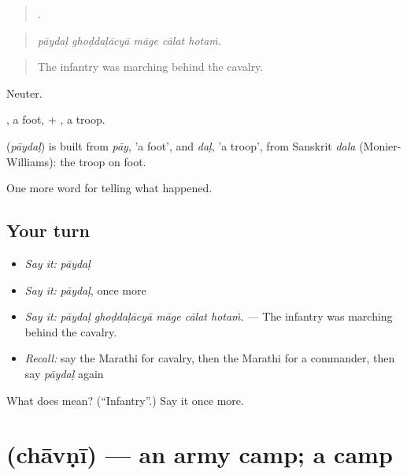 \begin{quote}
    .
\end{quote}

\begin{quote}
\emph{pāydaḷ ghoḍdaḷācyā māge cālat hotaṁ.}
\end{quote}

\begin{quote}
The infantry was marching behind the cavalry.
\end{quote}

Neuter.

, a foot, + , a troop.

\begin{cousinweb}
\textbf{} (\emph{pāydaḷ}) is built from \emph{pāy}, 'a foot', and \emph{daḷ}, 'a troop', from Sanskrit \emph{dala} (Monier-Williams): the troop on foot.
\end{cousinweb}

\begin{grammarlens}[title={What you've built}]
One more word for telling what happened.
\end{grammarlens}

\subsection*{Your turn}
\begin{itemize}
\raggedright
  \item \emph{Say it:} \emph{pāydaḷ}
  \item \emph{Say it:} \emph{pāydaḷ}, once more
  \item \emph{Say it:} \emph{pāydaḷ ghoḍdaḷācyā māge cālat hotaṁ.} — The infantry was marching behind the cavalry.
  \item \emph{Recall:} say the Marathi for cavalry, then the Marathi for a commander, then say \emph{pāydaḷ} again
\end{itemize}

\begin{tcolorbox}[breakable,colback=teal!4,colframe=teal!35!black,title={Before you move on}]
What does  mean? (\textquotedblleft{}Infantry\textquotedblright{}.) Say it once more.
\end{tcolorbox}
\section[\texorpdfstring{\mr{छावणी} (chāvṇī)}{छावणी (chāvṇī)}]{ (chāvṇī) — an army camp; a camp}

